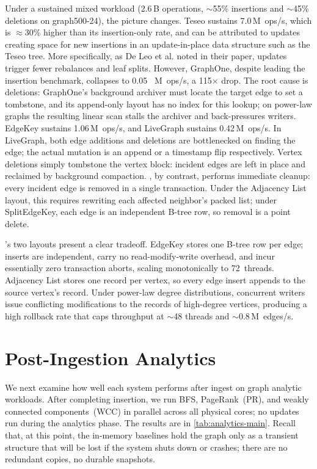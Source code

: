 Under a sustained mixed workload (2.6\,B operations, ${\sim}$55\% insertions and ${\sim}$45\% deletions on graph500-24), the picture changes.
Teseo sustains 7.0\,M~ops/s, which is $\approx$30\% higher than its insertion-only rate, and can be attributed to updates creating space for new insertions in an update-in-place data structure such as the Teseo tree.
More specifically, as De Leo et al. noted in their paper, updates trigger fewer rebalances and leaf splits\cite{teseo2021deLeo}.
However, GraphOne, despite leading the insertion benchmark, collapses to 0.05 \, M~ops/s, a 115$\times$ drop.
The root cause is deletions: GraphOne's background archiver must locate the target edge to set a tombstone, and its append-only layout has no index for this lookup; on power-law graphs the resulting linear scan stalls the archiver and back-pressures writers.
\project{} EdgeKey sustains 1.06\,M~ops/s, and LiveGraph sustains 0.42\,M~ops/s.
In LiveGraph, both edge additions and deletions are bottlenecked on finding the edge; the actual mutation is an append or a timestamp flip respectively. 
Vertex deletions simply tombstone the vertex block: incident edges are left in place and reclaimed by background compaction.
\project{}, by contrast, performs immediate cleanup: every incident edge is removed in a single transaction. 
Under the Adjacency List layout, this requires rewriting each affected neighbor's packed list; under SplitEdgeKey, each edge is an independent B-tree row, so removal is a point delete.

\project{}'s two layouts present a clear tradeoff.
EdgeKey stores one B-tree row per edge; inserts are independent, carry no read-modify-write overhead, and incur essentially zero transaction aborts, scaling monotonically to 72~threads.
Adjacency List stores one record per vertex, so every edge insert appends to the source vertex's record.
Under power-law degree distributions, concurrent writers issue conflicting modifications to the records of high-degree vertices, producing a high rollback rate that caps throughput at ${\sim}$48 threads and ${\sim}$0.8\,M~edges/s.

\section{Post-Ingestion Analytics}
We next examine how well each system performs after ingest on graph analytic workloads.
After completing insertion, we run BFS, PageRank~(PR), and weakly connected components~(WCC) in parallel across all physical cores; no updates run during the analytics phase.
The results are in \autoref{tab:analytics-main}.
Recall that, at this point, the in-memory baselines hold the graph only as a transient structure that will be lost if the system shuts down or crashes; there are no redundant copies, no durable snapshots.

